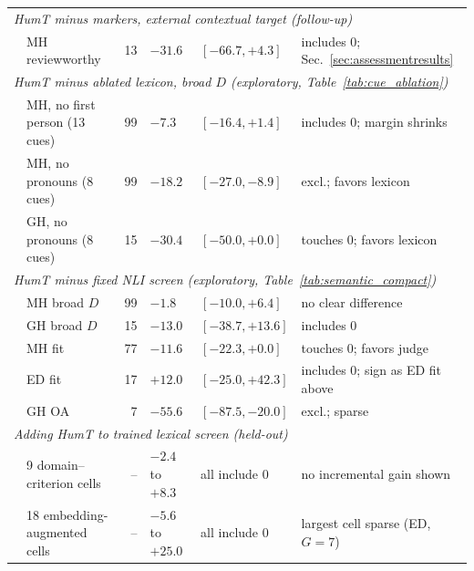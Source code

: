 \begin{table}[t]
\begin{tabular}{llrlll}
\midrule
\multicolumn{6}{l}{\emph{HumT minus markers, external contextual target (follow-up)}} \\
 & MH reviewworthy & 13 & $-31.6$ & $[-66.7, +4.3]$ & includes 0; Sec.~\ref{sec:assessmentresults} \\
\midrule
\multicolumn{6}{l}{\emph{HumT minus ablated lexicon, broad $D$ (exploratory, Table~\ref{tab:cue_ablation})}} \\
 & MH, no first person (13 cues) & 99 & $-7.3$ & $[-16.4, +1.4]$ & includes 0; margin shrinks \\
 & MH, no pronouns (8 cues) & 99 & $-18.2$ & $[-27.0, -8.9]$ & excl.; favors lexicon \\
 & GH, no pronouns (8 cues) & 15 & $-30.4$ & $[-50.0, +0.0]$ & touches 0; favors lexicon \\
\midrule
\multicolumn{6}{l}{\emph{HumT minus fixed NLI screen (exploratory, Table~\ref{tab:semantic_compact})}} \\
 & MH broad $D$ & 99 & $-1.8$ & $[-10.0, +6.4]$ & no clear difference \\
 & GH broad $D$ & 15 & $-13.0$ & $[-38.7, +13.6]$ & includes 0 \\
 & MH fit & 77 & $-11.6$ & $[-22.3, +0.0]$ & touches 0; favors judge \\
 & ED fit & 17 & $+12.0$ & $[-25.0, +42.3]$ & includes 0; sign as ED fit above \\
 & GH OA & 7 & $-55.6$ & $[-87.5, -20.0]$ & excl.; sparse \\
\midrule
\multicolumn{6}{l}{\emph{Adding HumT to trained lexical screen (held-out)}} \\
 & 9 domain--criterion cells & -- & $-2.4$ to $+8.3$ & all include 0 & no incremental gain shown \\
 & 18 embedding-augmented cells & -- & $-5.6$ to $+25.0$ & all include 0 & largest cell sparse (ED, $G=7$) \\
\bottomrule
\end{tabular}
\end{table}
